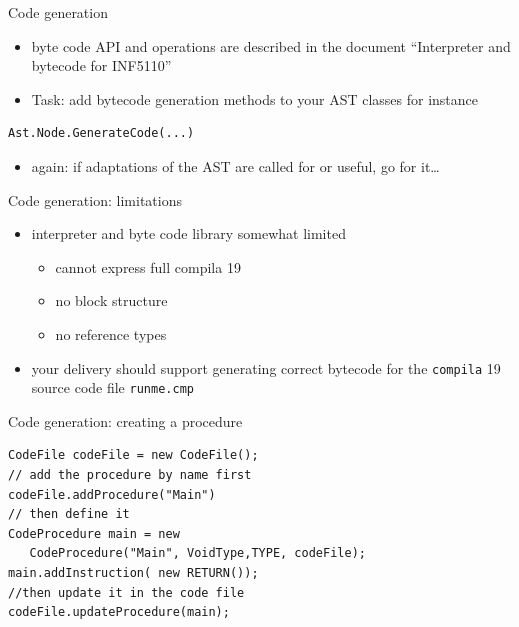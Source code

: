 \documentclass{beamer}
\begin{document}
\begin{frame}[label={sec:orgc26b804},fragile]{Code generation}
 \begin{itemize}
\item byte code API and operations are described in the document ``Interpreter
and bytecode for INF5110''

\item \alert{Task:} add bytecode generation methods to your AST classes
for instance
\end{itemize}

\begin{verbatim}
Ast.Node.GenerateCode(...)
\end{verbatim}
\begin{itemize}
\item again: if adaptations of the AST are called for or useful, go for it\ldots{}
\end{itemize}
\end{frame}


\begin{frame}[label={sec:org6674b1b},fragile]{Code generation: limitations}
 \begin{itemize}
\item interpreter and byte code library somewhat \alert{limited}
\begin{itemize}
\item cannot express full compila 19
\item no block structure
\item no reference types
\end{itemize}
\end{itemize}


\begin{itemize}
\item your delivery should support generating correct bytecode
for the \texttt{compila} 19 source code file \texttt{runme.cmp}
\end{itemize}
\end{frame}



\begin{frame}[label={sec:org5ee914c},fragile,plain]{Code generation: creating a procedure}
 \lstset{language=java,label= ,caption= ,captionpos=b,numbers=none}
\begin{lstlisting}
CodeFile codeFile = new CodeFile();
// add the procedure by name first
codeFile.addProcedure("Main")
// then define it
CodeProcedure main = new 
   CodeProcedure("Main", VoidType,TYPE, codeFile);
main.addInstruction( new RETURN());
//then update it in the code file
codeFile.updateProcedure(main);
\end{lstlisting}
\end{frame}
\end{document}
